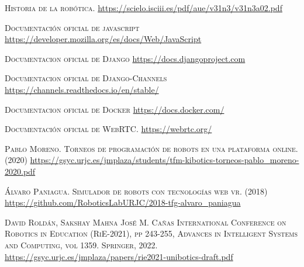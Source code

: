 \documentclass[a4paper, 12pt, oneside]{book}
\begin{document}
\begin{thebibliography}{X}
	 \textsc{Historia de la robótica.}
	\url{https://scielo.isciii.es/pdf/aue/v31n3/v31n3a02.pdf}
	
	 \textsc{Documentación oficial de javascript}
	\url{https://developer.mozilla.org/es/docs/Web/JavaScript}	
	
	 \textsc{Documentacion oficial de Django}
	\url{https://docs.djangoproject.com}
	
	 \textsc{Documentacion oficial de Django-Channels}
	\url{https://channels.readthedocs.io/en/stable/}
	
	 \textsc{Documentacion oficial de Docker}
	\url{https://docs.docker.com/}
	
	 \textsc{Documentación oficial de WebRTC.}
	\url{https://webrtc.org/}
	
	 \textsc{Pablo Moreno. Torneos de programación de robots
en una plataforma online. (2020)}
	\url{https://gsyc.urjc.es/jmplaza/students/tfm-kibotics-torneos-pablo_moreno-2020.pdf}
	
	 \textsc{Álvaro Paniagua. Simulador de robots con tecnologías web vr. (2018)}
	\url{https://github.com/RoboticsLabURJC/2018-tfg-alvaro_paniagua}
	
	 \textsc{David Roldán, Sakshay Mahna José M. Cañas
International Conference on Robotics in Education (RiE-2021), pp 243-255,
Advances in Intelligent Systems and Computing, vol 1359. Springer, 2022.}
	\url{https://gsyc.urjc.es/jmplaza/papers/rie2021-unibotics-draft.pdf}
	
\end{thebibliography}
\end{document}
